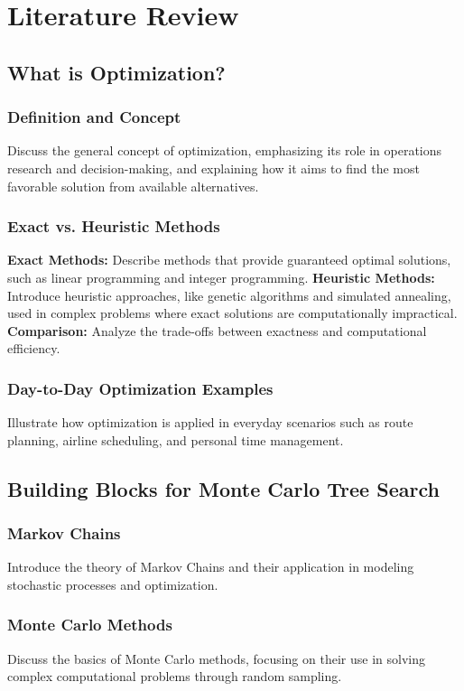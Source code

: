 \chapter{Literature Review}
\label{Chapter2}

\section{What is Optimization?}
\subsection{Definition and Concept}
Discuss the general concept of optimization, emphasizing its role in operations research and decision-making, and explaining how it aims to find the most favorable solution from available alternatives.

\subsection{Exact vs. Heuristic Methods}
\textbf{Exact Methods:} Describe methods that provide guaranteed optimal solutions, such as linear programming and integer programming.
\textbf{Heuristic Methods:} Introduce heuristic approaches, like genetic algorithms and simulated annealing, used in complex problems where exact solutions are computationally impractical.
\textbf{Comparison:} Analyze the trade-offs between exactness and computational efficiency.

\subsection{Day-to-Day Optimization Examples}
Illustrate how optimization is applied in everyday scenarios such as route planning, airline scheduling, and personal time management.

\section{Building Blocks for Monte Carlo Tree Search}
\subsection{Markov Chains}
Introduce the theory of Markov Chains and their application in modeling stochastic processes and optimization.
\subsection{Monte Carlo Methods}
Discuss the basics of Monte Carlo methods, focusing on their use in solving complex computational problems through random sampling.

